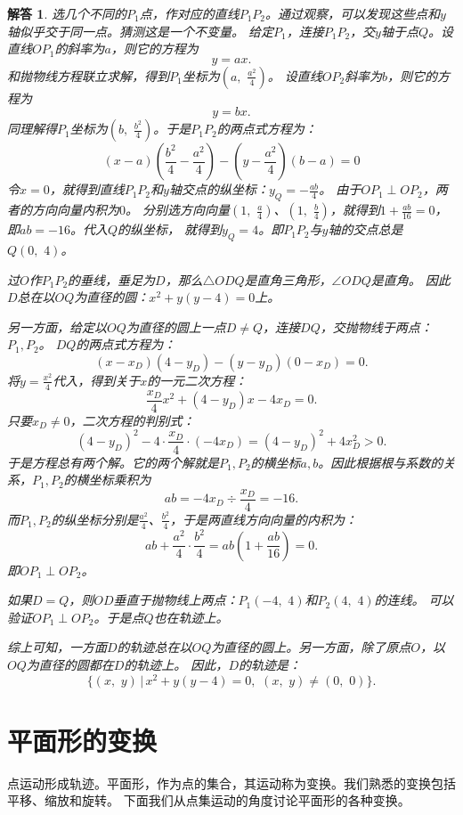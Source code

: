 \documentclass[12pt,UTF8]{ctexbook}
\newtheorem*{so}{解答}
\begin{document}
\begin{so}
    选几个不同的$P_1$点，作对应的直线$P_1P_2$。通过观察，可以发现这些点和$y$轴似乎交于同一点。猜测这是一个不变量。
    给定$P_1$，连接$P_1P_2$，交$y$轴于点$Q$。设直线$OP_1$的斜率为$a$，则它的方程为
    $$ y = ax. $$
    和抛物线方程联立求解，得到$P_1$坐标为$(a, \,\, \frac{a^2}{4})$。
    设直线$OP_2$斜率为$b$，则它的方程为
    $$ y = bx. $$
    同理解得$P_1$坐标为$(b, \,\, \frac{b^2}{4})$。于是$P_1P_2$的两点式方程为：
    $$ (x - a)(\frac{b^2}{4} - \frac{a^2}{4}) - (y - \frac{a^2}{4})(b - a) = 0$$
    令$x=0$，就得到直线$P_1P_2$和$y$轴交点的纵坐标：$y_Q = -\frac{ab}{4}$。
    由于$OP_1 \perp OP_2$，两者的方向向量内积为$0$。
    分别选方向向量$(1,\,\,\frac{a}{4})$、$(1,\,\,\frac{b}{4})$，就得到$1 + \frac{ab}{16} = 0$，即$ab = -16$。代入$Q$的纵坐标，
    就得到$y_Q = 4$。即$P_1P_2$与$y$轴的交点总是$Q(0,\,\,4)$。

    过$O$作$P_1P_2$的垂线，垂足为$D$，那么$\triangle ODQ$是直角三角形，$\angle ODQ$是直角。
    因此$D$总在以$OQ$为直径的圆：$x^2 + y(y-4) = 0$上。

    另一方面，给定以$OQ$为直径的圆上一点$D\neq Q$，连接$DQ$，交抛物线于两点：$P_1,P_2$。
    $DQ$的两点式方程为：
    $$ (x - x_D)(4 - y_D) - (y - y_D)(0 - x_D) = 0.$$
    将$y = \frac{x^2}{4}$代入，得到关于$x$的一元二次方程：
    $$ \frac{x_D}{4}x^2 + \left(4 - y_D\right)x - 4x_D = 0.$$
    只要$x_D\neq 0$，二次方程的判别式：
    $$ (4 - y_D)^2 - 4\cdot \frac{x_D}{4}\cdot(- 4x_D) = (4 - y_D)^2 + 4x_D^2 > 0.$$
    于是方程总有两个解。它的两个解就是$P_1,P_2$的横坐标$a,b$。因此根据根与系数的关系，$P_1,P_2$的横坐标乘积为
    $$ab = -4x_D \div \frac{x_D}{4} = -16.$$
    而$P_1,P_2$的纵坐标分别是$\frac{a^2}{4}$、$\frac{b^2}{4}$，于是两直线方向向量的内积为：
    $$ ab + \frac{a^2}{4}\cdot\frac{b^2}{4} = ab(1 + \frac{ab}{16}) = 0.$$
    即$OP_1 \perp OP_2$。
    
    如果$D=Q$，则$OD$垂直于抛物线上两点：$P_1(-4,\,\,4)$和$P_2(4,\,\,4)$的连线。
    可以验证$OP_1\perp OP_2$。于是点$Q$也在轨迹上。
    
    综上可知，一方面$D$的轨迹总在以$OQ$为直径的圆上。另一方面，除了原点$O$，以$OQ$为直径的圆都在$D$的轨迹上。
    因此，$D$的轨迹是：
    $$\{(x,\,\,y) \, | \, x^2 + y(y-4) = 0, \,\, (x,\,\,y)\neq (0,\,\,0)\}.$$
\end{so}

\section{平面形的变换}
点运动形成轨迹。平面形，作为点的集合，其运动称为变换。我们熟悉的变换包括平移、缩放和旋转。
下面我们从点集运动的角度讨论平面形的各种变换。
\end{document}
